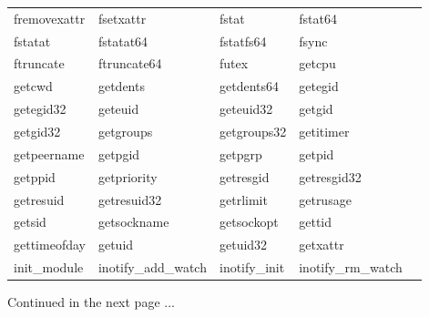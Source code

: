 \begin{center}
\begin{table}
\begin{tabular}{l p{3.5cm} p{3.5cm} p{3.5cm} p{3.5cm}|}
fremovexattr & fsetxattr & fstat & fstat64 \\
fstatat & fstatat64 & fstatfs64 & fsync \\
ftruncate & ftruncate64 & futex & getcpu \\
getcwd & getdents & getdents64 & getegid \\
getegid32 & geteuid & geteuid32 & getgid \\
getgid32 & getgroups & getgroups32 & getitimer \\
getpeername & getpgid & getpgrp & getpid \\
getppid & getpriority & getresgid & getresgid32 \\
getresuid & getresuid32 & getrlimit & getrusage \\
getsid & getsockname & getsockopt & gettid \\
gettimeofday & getuid & getuid32 & getxattr \\
init\_module & inotify\_add\_watch & inotify\_init & inotify\_rm\_watch \\
\hline
\end{tabular}
\bigskip
Continued in the next page ... \\
\end{table}


\end{center}
